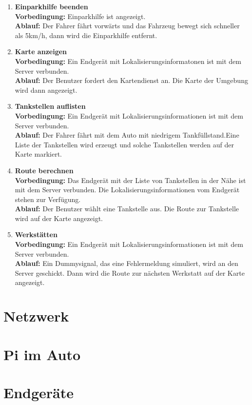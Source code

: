 \documentclass[pflichtenheft.tex]{subfiles}
\begin{document}
\begin{enumerate}
\item{\textbf{Einparkhilfe beenden}} \\
\textbf{Vorbedingung: } Einparkhilfe ist angezeigt. \\
\textbf{Ablauf: } Der Fahrer fährt vorwärts und das Fahrzeug bewegt sich
schneller als 5km/h, dann wird die Einparkhilfe entfernt.


\item{\textbf{Karte anzeigen}} \\
\textbf{Vorbedingung: } Ein Endgerät mit Lokalisierungsinformatonen ist mit dem
Server verbunden.\\
\textbf{Ablauf: } Der Benutzer fordert den Kartendienst an. Die Karte der
Umgebung wird dann angezeigt.

\item{\textbf{Tankstellen auflisten}} \\
\textbf{Vorbedingung: } Ein Endgerät mit Lokalisierungsinformationen ist mit dem
Server verbunden.\\
\textbf{Ablauf: } Der Fahrer fährt mit dem Auto mit niedrigem Tankfüllstand.Eine
Liste der Tankstellen wird erzeugt und solche Tankstellen werden auf der
Karte markiert. 

\item{\textbf{Route berechnen}} \\
\textbf{Vorbedingung: } Das Endgerät mit der Liste von Tankstellen in der Nähe
ist mit dem Server verbunden. Die Lokalisierungsinformationen vom Endgerät
stehen zur Verfügung.\\
\textbf{Ablauf: } Der Benutzer wählt eine Tankstelle aus. Die Route zur
Tankstelle wird auf der Karte angezeigt.

\item{\textbf{Werkstätten}} \\
\textbf{Vorbedingung: } Ein Endgerät mit Lokalisierungsinformationen ist mit dem
Server verbunden. \\
\textbf{Ablauf: } Ein Dummysignal, das eine Fehlermeldung simuliert, wird
an den Server geschickt. Dann wird die Route zur nächsten Werkstatt auf der
Karte angezeigt.



\end{enumerate}

\section{Netzwerk}
\section{Pi im Auto}
\section{Endgeräte}
\end{document}
